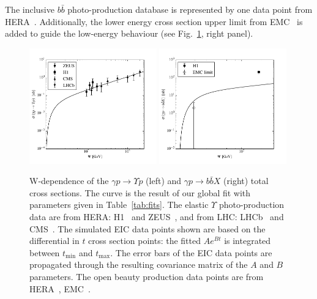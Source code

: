 \documentclass[10pt,prd,aps,nofootinbib,superscriptaddress]{revtex4}
\begin{document}
The inclusive $b \bar b$ photo-production database is represented by one data point from HERA~\cite{Adloff:1999nr}.
Additionally, the lower energy cross section upper limit from EMC~\cite{Aubert:1981gx}
is added to guide the low-energy behaviour (see Fig.~\ref{fig:sigmatot}, right panel).

\begin{figure}
\includegraphics[width=0.49\textwidth]{si_y.pdf}
\includegraphics[width=0.49\textwidth]{si_bbX.pdf}
\caption{W-dependence of the $\gamma p \to \Upsilon p$ (left) and $\gamma p \to b \bar b X$ (right) total cross sections.
The curve is the result of our global fit with parameters given in Table~\ref{tab:fits}.
The elastic $\Upsilon$ photo-production data are from HERA: H1~\cite{Adloff:2000vm}
and ZEUS~\cite{Breitweg:1998ki, Chekanov:2009zz}, and from LHC: LHCb~\cite{Aaij:2015kea} 
and CMS~\cite{Sirunyan:2018sav}. 
The simulated EIC data points shown are based on the differential in $t$ cross section points:
the fitted $Ae^{Bt}$ is integrated between $t_\mathrm{min}$ and $t_\mathrm{max}$.
The error bars of the EIC data points are propagated through the resulting covariance matrix of the $A$ and $B$ parameters.
The open beauty production data points are from HERA~\cite{Adloff:1999nr}, EMC~\cite{Aubert:1981gx}.}
\label{fig:sigmatot}
\end{figure}
\end{document}
